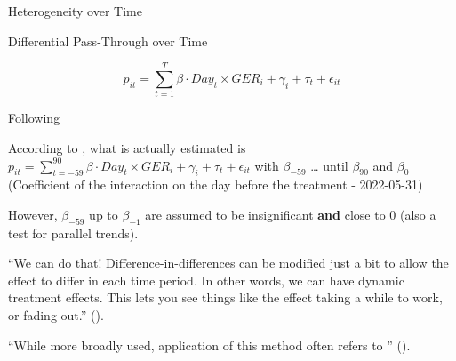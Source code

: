 



\begin{frame}{Heterogeneity over Time}


\vspace{-1.2cm}


\begin{block}{Differential Pass-Through over Time}

\begin{equation}
\label{eq:Diff_DiD}
p_{it} = \sum_{t=1}^{T} \beta \cdot Day_{t} \times GER_{i} + \gamma_{i} + \tau_{t} + \epsilon_{it}
\end{equation}

\begin{tiny}
    Following \textcite{Frondel2024}
\end{tiny}


\end{block}

\pause

According to \textcite{Huntington2022}, what is actually estimated is $p_{it} = \sum_{t=-59}^{90} \beta \cdot Day_{t} \times GER_{i} + \gamma_{i} + \tau_{t} + \epsilon_{it}$ with $\beta_{-59}$ … until $\beta_{90}$ and $\beta_{0}$ (Coefficient of the interaction on the day before the treatment - 2022-05-31) \pause

However, $\beta_{-59}$ up to $\beta_{-1}$ are assumed to be insignificant \textbf{and} close to 0 (also a test for parallel trends). 

    
\end{frame}









\begin{frame}


\enquote{We can do that! Difference-in-differences can be modified just a bit to allow the effect to differ in each time period. In other words, we can have dynamic treatment effects. This lets you see things like the effect taking a while to work, or fading out.} (\cite{Huntington2022}). \newline

\enquote{While more broadly used, application of this method often refers to \textcite{Autor2001}} (\cite{Huntington2022}).


    
\end{frame}














